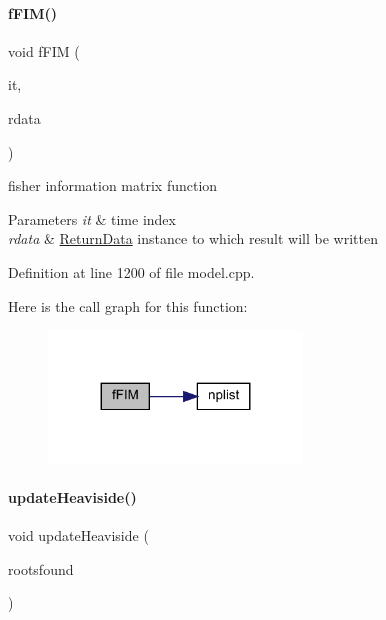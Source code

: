 \paragraph{\texorpdfstring{f\+F\+I\+M()}{fFIM()}}
{\footnotesize\ttfamily void f\+F\+IM (\begin{DoxyParamCaption}\item[{const int}]{it,  }\item[{\mbox{\hyperlink{classamici_1_1_return_data}{Return\+Data}} $\ast$}]{rdata }\end{DoxyParamCaption})}

fisher information matrix function 
\begin{DoxyParams}{Parameters}
{\em it} & time index \\
\hline
{\em rdata} & \mbox{\hyperlink{classamici_1_1_return_data}{Return\+Data}} instance to which result will be written \\
\hline
\end{DoxyParams}


Definition at line 1200 of file model.\+cpp.

Here is the call graph for this function\+:
\nopagebreak
\begin{figure}[H]
\begin{center}
\leavevmode
\includegraphics[width=191pt]{classamici_1_1_model_aba7a1237e503813d9ec7ca56413f1e1d_cgraph}
\end{center}
\end{figure}
\mbox{\label{classamici_1_1_model_ae053072690046bd24225447de93a9e84}} 
\paragraph{\texorpdfstring{update\+Heaviside()}{updateHeaviside()}}
{\footnotesize\ttfamily void update\+Heaviside (\begin{DoxyParamCaption}\item[{const std\+::vector$<$ int $>$ \&}]{rootsfound }\end{DoxyParamCaption})}

